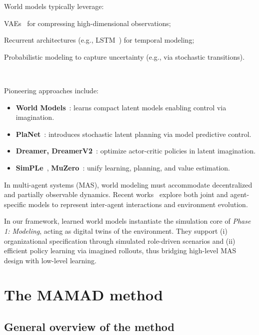 \documentclass[pdflatex,sn-mathphys-num]{sn-jnl}%
\theoremstyle{thmstyleone}%
\theoremstyle{thmstyletwo}%
\theoremstyle{thmstylethree}%
\begin{document}
World models typically leverage:
\begin{enumerate*}[label={\roman*) },itemjoin={; \quad}]
    \item VAEs~\cite{kingma2013auto} for compressing high-dimensional observations;
    \item Recurrent architectures (e.g., LSTM~\cite{hochreiter1997long}) for temporal modeling;
    \item Probabilistic modeling to capture uncertainty (e.g., via stochastic transitions).
\end{enumerate*}

\

\noindent Pioneering approaches include:
\begin{itemize}
    \item \textbf{World Models}~\cite{ha2018recurrent}: learns compact latent models enabling control via imagination.
    \item \textbf{PlaNet}~\cite{hafner2019learning}: introduces stochastic latent planning via model predictive control.
    \item \textbf{Dreamer, DreamerV2}~\cite{hafner2020dream,hafner2021mastering}: optimize actor-critic policies in latent imagination.
    \item \textbf{SimPLe}~\cite{kaiser2019model}, \textbf{MuZero}~\cite{schrittwieser2020mastering}: unify learning, planning, and value estimation.
\end{itemize}

In multi-agent systems (MAS), world modeling must accommodate decentralized and partially observable dynamics. Recent works~\cite{yang2021representation} explore both joint and agent-specific models to represent inter-agent interactions and environment evolution.

In our framework, learned world models instantiate the simulation core of \textit{Phase 1: Modeling}, acting as digital twins of the environment. They support (i) organizational specification through simulated role-driven scenarios and (ii) efficient policy learning via imagined rollouts, thus bridging high-level MAS design with low-level learning.




\section{The MAMAD method}\label{sec:mamad}

\subsection{General overview of the method}
\end{document}
